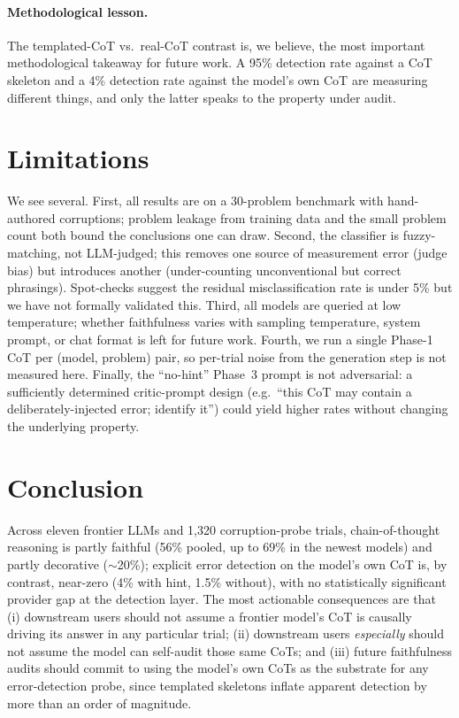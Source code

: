 \documentclass[11pt]{article}
\begin{document}
\paragraph{Methodological lesson.} The templated-CoT vs.\ real-CoT contrast is, we believe, the most important methodological takeaway for future work. A 95\% detection rate against a CoT skeleton and a 4\% detection rate against the model's own CoT are measuring different things, and only the latter speaks to the property under audit.

\section{Limitations}

We see several. First, all results are on a 30-problem benchmark with hand-authored corruptions; problem leakage from training data and the small problem count both bound the conclusions one can draw. Second, the classifier is fuzzy-matching, not LLM-judged; this removes one source of measurement error (judge bias) but introduces another (under-counting unconventional but correct phrasings). Spot-checks suggest the residual misclassification rate is under 5\% but we have not formally validated this. Third, all models are queried at low temperature; whether faithfulness varies with sampling temperature, system prompt, or chat format is left for future work. Fourth, we run a single Phase-1 CoT per (model, problem) pair, so per-trial noise from the generation step is not measured here. Finally, the ``no-hint'' Phase~3 prompt is not adversarial: a sufficiently determined critic-prompt design (e.g.\ ``this CoT may contain a deliberately-injected error; identify it'') could yield higher rates without changing the underlying property.

\section{Conclusion}

Across eleven frontier LLMs and 1{,}320 corruption-probe trials, chain-of-thought reasoning is partly faithful (56\% pooled, up to 69\% in the newest models) and partly decorative ($\sim$20\%); explicit error detection on the model's own CoT is, by contrast, near-zero (4\% with hint, 1.5\% without), with no statistically significant provider gap at the detection layer. The most actionable consequences are that (i) downstream users should not assume a frontier model's CoT is causally driving its answer in any particular trial; (ii) downstream users \emph{especially} should not assume the model can self-audit those same CoTs; and (iii) future faithfulness audits should commit to using the model's own CoTs as the substrate for any error-detection probe, since templated skeletons inflate apparent detection by more than an order of magnitude.
\end{document}
